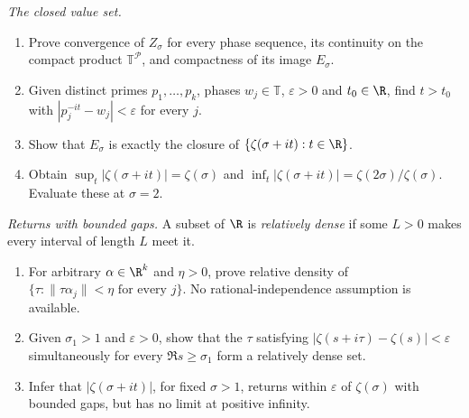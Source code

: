 \begin{exercise}[$\star\star$]\label{pb:bohrvalues}
\emph{The closed value set.}
\begin{enumerate}[label=(\alph*)]
\item Prove convergence of $Z_\sigma$ for every phase sequence, its continuity on the compact product $\mathbb T^{\mathcal P}$, and compactness of its image $E_\sigma$.
\item Given distinct primes $p_1,\ldots,p_k$, phases $w_j\in\mathbb T$, $\varepsilon>0$ and $t_0\in\R$, find $t>t_0$ with $|p_j^{-it}-w_j|<\varepsilon$ for every $j$.
\item Show that $E_\sigma$ is exactly the closure of $\{\zeta(\sigma+it):t\in\R\}$.
\item Obtain $\sup_t|\zeta(\sigma+it)|=\zeta(\sigma)$ and $\inf_t|\zeta(\sigma+it)|=\zeta(2\sigma)/\zeta(\sigma)$. Evaluate these at $\sigma=2$.
\end{enumerate}
\end{exercise}
\begin{exercise}[$\star\star$]\label{pb:almostperiodic}
\emph{Returns with bounded gaps.} A subset of $\R$ is \emph{relatively dense} if some $L>0$ makes every interval of length $L$ meet it.
\begin{enumerate}[label=(\alph*)]
\item For arbitrary $\alpha\in\R^k$ and $\eta>0$, prove relative density of $\{\tau:\|\tau\alpha_j\|<\eta\text{ for every }j\}$. No rational-independence assumption is available.
\item Given $\sigma_1>1$ and $\varepsilon>0$, show that the $\tau$ satisfying $|\zeta(s+i\tau)-\zeta(s)|<\varepsilon$ simultaneously for every $\Re s\ge\sigma_1$ form a relatively dense set.
\item Infer that $|\zeta(\sigma+it)|$, for fixed $\sigma>1$, returns within $\varepsilon$ of $\zeta(\sigma)$ with bounded gaps, but has no limit at positive infinity.
\end{enumerate}
\end{exercise}
